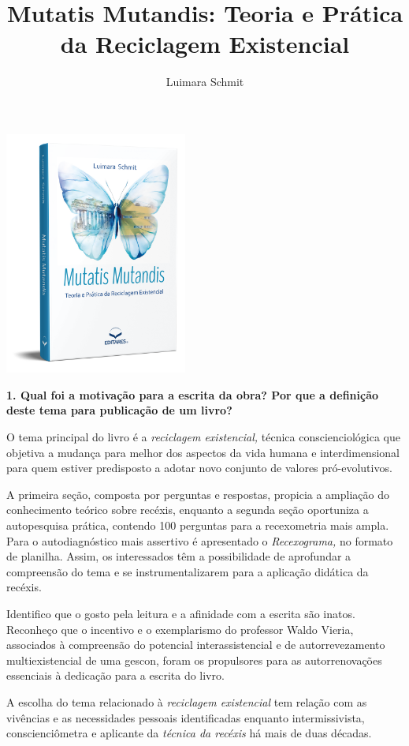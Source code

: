 \documentclass{gescons}
\author{Luimara Schmit}
\title{Mutatis Mutandis: Teoria e Prática da Reciclagem Existencial}
\begin{document}
    \makeentrevistatitle

    \begin{multicols}{2}

\begin{center}
    \includegraphics[width=6cm]{articles/entrevista/mockups/Luimara.png}
\end{center}

\textbf{1. Qual foi a motivação para a escrita da obra? Por que a definição deste tema para publicação de um livro?}


O tema principal do livro é a \emph{reciclagem existencial,} técnica conscienciológica que objetiva a mudança para melhor dos aspectos da vida humana e interdimensional para quem estiver predisposto a adotar novo conjunto de valores pró-evolutivos.

A primeira seção, composta por perguntas e respostas, propicia a ampliação do conhecimento teórico sobre recéxis, enquanto a segunda seção oportuniza a autopesquisa prática, contendo 100 perguntas para a recexometria mais ampla. Para o autodiagnóstico mais assertivo é apresentado o \emph{Recexograma,} no formato de planilha. Assim, os interessados têm a possibilidade de aprofundar a compreensão do tema e se instrumentalizarem para a aplicação didática da recéxis.

Identifico que o gosto pela leitura e a afinidade com a escrita são inatos. Reconheço que o incentivo e o exemplarismo do professor Waldo Vieria, associados à compreensão do potencial interassistencial e de autorrevezamento multiexistencial de uma gescon, foram os propulsores para as autorrenovações essenciais à dedicação para a escrita do livro.

A escolha do tema relacionado à \emph{reciclagem existencial} tem relação com as vivências e as necessidades pessoais identificadas enquanto intermissivista, conscienciômetra e aplicante da \emph{técnica da recéxis} há mais de duas décadas.


\end{multicols}
\end{document}
